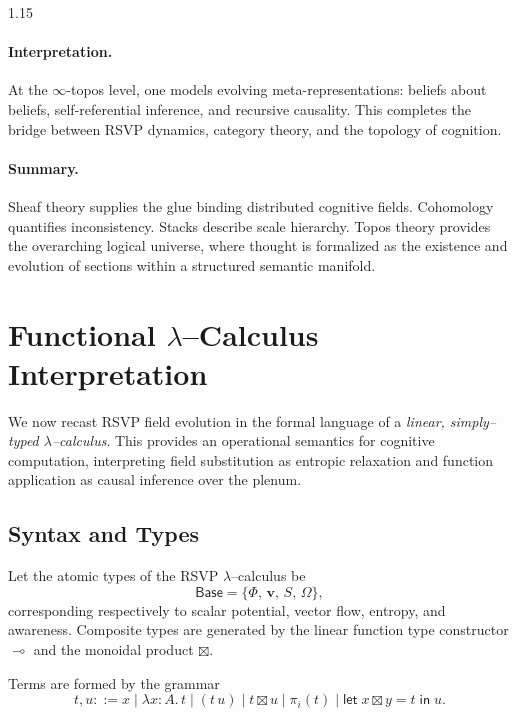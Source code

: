 \documentclass[12pt,a4paper]{article}
\begin{document}
\begin{spacing}{1.15}
\paragraph{Interpretation.}
At the \(\infty\)-topos level,
one models evolving meta-representations:
beliefs about beliefs, self-referential inference,
and recursive causality.
This completes the bridge between RSVP dynamics,
category theory, and the topology of cognition.

\paragraph{Summary.}
Sheaf theory supplies the glue binding distributed cognitive fields.
Cohomology quantifies inconsistency.
Stacks describe scale hierarchy.
Topos theory provides the overarching logical universe,
where thought is formalized as the existence and evolution of sections
within a structured semantic manifold.


\section{Functional $\lambda$--Calculus Interpretation}
\label{sec:lambda-calculus}

We now recast RSVP field evolution in the formal language of a
\emph{linear, simply--typed $\lambda$--calculus}.
This provides an operational semantics for cognitive computation,
interpreting field substitution as entropic relaxation
and function application as causal inference over the plenum.

\subsection{Syntax and Types}

\begin{definition}
\label{def:types}
Let the atomic types of the RSVP $\lambda$--calculus be
\[
  \mathsf{Base} = \{\Phi,\, \mathbf{v},\, S,\, \Omega\},
\]
corresponding respectively to scalar potential, vector flow,
entropy, and awareness. Composite types are generated by
the linear function type constructor $\multimap$
and the monoidal product $\boxtimes$.
\end{definition}

\begin{definition}[Terms]
\label{def:terms}
Terms are formed by the grammar
\[
  t,u ::= x
  \;\big|\;
  \lambda x{:}A.\,t
  \;\big|\;
  (t\,u)
  \;\big|\;
  t\boxtimes u
  \;\big|\;
  \pi_i(t)
  \;\big|\;
  \mathsf{let}\;x\boxtimes y = t\;\mathsf{in}\;u.
\]
\end{definition}


\end{spacing}
\end{document}
